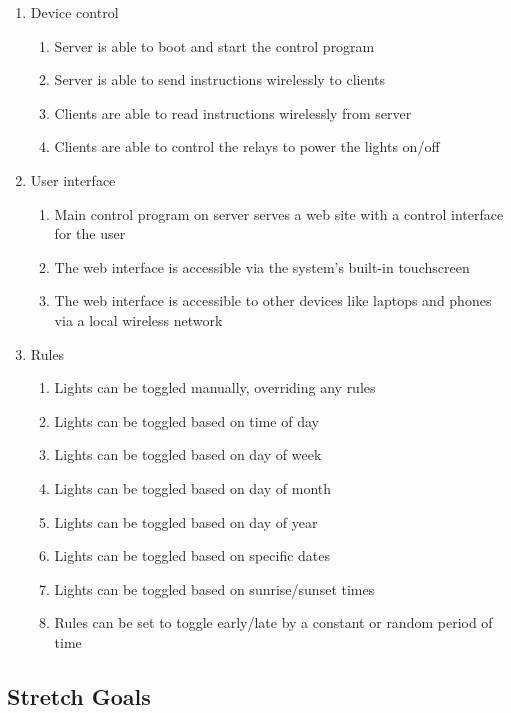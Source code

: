 \documentclass[12pt]{article}
\begin{document}
\begin{enumerate}
    \item Device control
        \begin{enumerate}
            \item Server is able to boot and start the control program
            \item Server is able to send instructions wirelessly to clients
            \item Clients are able to read instructions wirelessly from server
            \item Clients are able to control the relays to power the lights on/off
        \end{enumerate}

    \item User interface
        \begin{enumerate}
            \item Main control program on server serves a web site with a control interface for the user
            \item The web interface is accessible via the system's built-in touchscreen
            \item The web interface is accessible to other devices like laptops and phones via a local wireless network
        \end{enumerate}

    \item Rules
        \begin{enumerate}
            \item Lights can be toggled manually, overriding any rules
            \item Lights can be toggled based on time of day
            \item Lights can be toggled based on day of week
            \item Lights can be toggled based on day of month
            \item Lights can be toggled based on day of year
            \item Lights can be toggled based on specific dates
            \item Lights can be toggled based on sunrise/sunset times
            \item Rules can be set to toggle early/late by a constant or random period of time
        \end{enumerate}
\end{enumerate}

\subsection{Stretch Goals}
\end{document}
